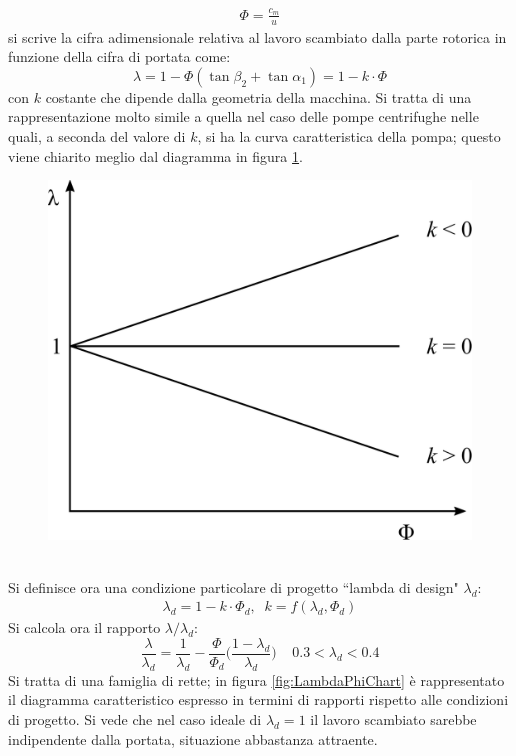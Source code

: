 \begin{align*}
\Phi = \frac{c_m}{u}
\end{align*}
si scrive la cifra adimensionale relativa al lavoro scambiato dalla parte rotorica in funzione della cifra di portata come:
\begin{equation}
\lambda = 1 - \Phi \left( \tan \beta_2 + \tan \alpha_1 \right) = 1 - k \cdot \Phi
\end{equation}
con $k$ costante che dipende dalla geometria della macchina. Si tratta di una rappresentazione molto simile a quella nel caso delle pompe centrifughe nelle quali, a seconda del valore di $k$, si ha la curva caratteristica della pompa; questo viene chiarito meglio dal diagramma in figura \ref{fig:CondProg}.
\begin{figure}
\centering
  \includegraphics[width=.4\textwidth]{fig/CondProg.pdf}
\caption{}
\label{fig:CondProg}
\end{figure}
\\Si definisce ora una condizione particolare di progetto ``lambda di design" $\lambda_d$:
\begin{align*}
\lambda_d = 1 - k \cdot \Phi_d, \;\; k = f(\lambda_d,\Phi_d)
\end{align*}
Si calcola ora il rapporto $\lambda/\lambda_d$:
\begin{equation} \label{eq:lambdad}
\frac{\lambda}{\lambda_d} = \frac{1}{\lambda_d} - \frac{\Phi}{\Phi_d} \Bigg( \frac{1-\lambda_d}{\lambda_d} \Bigg) \;\;\;\; 0.3 < \lambda_d < 0.4
\end{equation}
Si tratta di una famiglia di rette; in figura \ref{fig:LambdaPhiChart} è rappresentato il diagramma caratteristico espresso in termini di rapporti rispetto alle condizioni di progetto. Si vede che nel caso ideale di $\lambda_d = 1$ il lavoro scambiato sarebbe indipendente dalla portata, situazione abbastanza attraente. 
